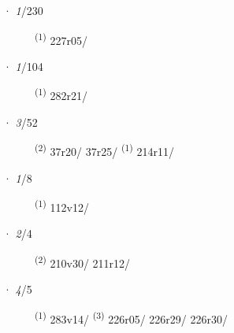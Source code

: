 \ENTRYEND
\noindent{} · \textit{1}/230 \LEMMALINE
\begin{description}
    \item[]  \textsuperscript{(1)} \mbox{227r05/}
\end{description}
\ENTRYEND
\noindent{} · \textit{1}/104 \LEMMALINE
\begin{description}
    \item[]  \textsuperscript{(1)} \mbox{282r21/}
\end{description}
\ENTRYEND
\noindent{} · \textit{3}/52 \LEMMALINE
\begin{description}
    \item[]  \textsuperscript{(2)} \mbox{37r20/} \mbox{37r25/} \textsuperscript{(1)} \mbox{214r11/}
\end{description}
\ENTRYEND
\noindent{} · \textit{1}/8 \LEMMALINE
\begin{description}
    \item[]  \textsuperscript{(1)} \mbox{112v12/}
\end{description}
\ENTRYEND
\noindent{} · \textit{2}/4 \LEMMALINE
\begin{description}
    \item[]  \textsuperscript{(2)} \mbox{210v30/} \mbox{211r12/}
\end{description}
\ENTRYEND
\noindent{} · \textit{4}/5 \LEMMALINE
\begin{description}
    \item[]  \textsuperscript{(1)} \mbox{283v14/} \CASEBREAK {} \textsuperscript{(3)} \mbox{226r05/} \mbox{226r29/} \mbox{226r30/}
\end{description}
\ENTRYEND

